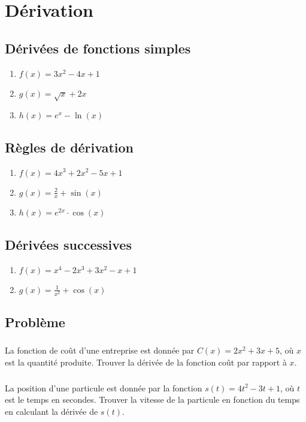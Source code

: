 \documentclass[12pt,a4paper,fleqn]{article}
\begin{document}
\section{Dérivation}
\subsection{Dérivées de fonctions simples}
\begin{enumerate}
 \item \(f(x) = 3x^2 - 4x + 1\)
 \item \(g(x) = \sqrt{x} + 2x\)
 \item \(h(x) = e^x - \ln(x)\)
\end{enumerate}
\subsection{Règles de dérivation}
\begin{enumerate}
    \item  \(f(x) = 4x^3 + 2x^2 - 5x + 1\)
    \item  \(g(x) = \frac{2}{x} + \sin(x)\)
    \item  \(h(x) = e^{2x} \cdot \cos(x)\)
\end{enumerate}
\subsection{Dérivées successives}
\begin{enumerate}
    \item \(f(x) = x^4 - 2x^3 + 3x^2 - x + 1\)
    \item  \(g(x) = \frac{1}{x^2} + \cos(x)\)
\end{enumerate}
\subsection{Problème}
\subsubsection{} La fonction de coût d'une entreprise est donnée par \(C(x) = 2x^2 + 3x + 5\), où \(x\) est la quantité produite. Trouver la dérivée de la fonction coût par rapport à \(x\).
\subsubsection{} La position d'une particule est donnée par la fonction \(s(t) = 4t^2 - 3t + 1\), où \(t\) est le temps en secondes. Trouver la vitesse de la particule en fonction du temps en calculant la dérivée de \(s(t)\).
\end{document}
